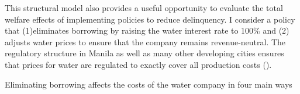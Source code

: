 \documentclass[12pt]{article}
\begin{document}

This structural model also provides a useful opportunity to evaluate the total welfare effects of implementing policies to reduce delinquency.  I consider a policy that (1)eliminates borrowing by raising the water interest rate to 100\% and (2) adjusts water prices to ensure that the company remains revenue-neutral.  The regulatory structure in Manila as well as many other developing cities ensures that prices for water are regulated to exactly cover all production costs (\cite{hoque2013state}).

Eliminating borrowing affects the costs of the water company in four main ways
\end{document}
